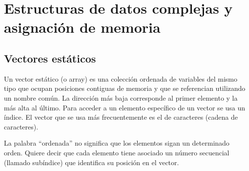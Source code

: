 \chapter{Estructuras de datos complejas y asignación de memoria}
\setcounter{section}{0}
\section{Vectores estáticos}
Un vector estático (o array) es una colección ordenada de variables del mismo tipo que ocupan posiciones contiguas de memoria y que se referencian utilizando un nombre común. La dirección más baja corresponde al primer elemento y la más alta al último. Para acceder a un elemento específico de un vector se usa un índice. El vector que se usa más frecuentemente es el de caracteres (cadena de caracteres).

La palabra ``ordenada'' no significa que los elementos sigan un determinado orden. Quiere decir que cada elemento tiene asociado un número secuencial (llamado subíndice) que identifica su posición en el vector.
